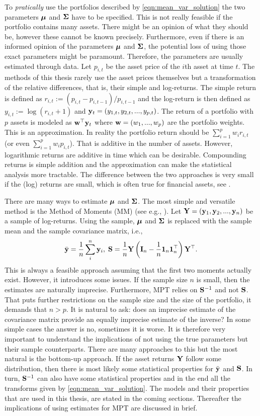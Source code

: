 \documentclass[12pt, oneside]{book}\usepackage{knitr}
\begin{document}
{To \textit{pratically} use the portfolios described by \eqref{eqn:mean_var_solution} the two parameters $\mbox{\boldmath$\mu$}$ and $\mathbf{\Sigma}$ have to be specified. 
This is not really feasible if the portfolio contains many assets. 
There might be an opinion of what they should be, however these cannot be known precisely. 
Furthermore, even if there is an informed opinion of the parameters $\mbox{\boldmath$\mu$}$ and $\mathbf{\Sigma}$, the potential loss of using those exact parameters might be paramount. 
Therefore, the parameters are usually estimated through data.
Let $p_{i,t}$ be the asset price of the $i$th asset at time $t$. 
The methods of this thesis rarely use the asset prices themselves but a transformation of the relative differences, that is, their simple and log-returns. 
The simple return is defined as $r_{i,t} := (p_{i,t}-p_{i,t-1})/p_{i,t-1}$ and the log-return is then defined as $y_{i,t} := \log(r_{i,t} + 1)$ and $\mathbf{y}_t=(y_{1,t},y_{2,t},..., y_{p,t})$.
The return of a portfolio with $p$ assets is modeled as $\mathbf{w}^\top \mathbf{y}_t$ where $\mathbf{w}=(w_1, ..., w_p)$ are the portfolio weights.
This is an approximation. 
In reality the portfolio return should be $\sum_{i=1}^p w_i r_{i,t}$ (or even $\sum_{i=1}^p w_i p_{i,t}$). 
That is additive in the number of assets.
However, logarithmic returns are additive in time which can be desirable. 
Compounding returns is simple addition and the approximation can make the statistical analysis more tractable. 
The difference between the two approaches is very small if the (log) returns are small, which is often true for financial assets, see \citet[p. 5]{tsay2005analysis}. 

There are many ways to estimate $\mbox{\boldmath$\mu$}$ and $\mathbf{\Sigma}$.
The most simple and versatile method is the Method of Moments (MM) (see e.g., \citet[ch. 9]{wasserman2004all}). 
Let $\mathbf{Y} = (\mathbf{y}_1, \mathbf{y}_2, ..., \mathbf{y}_n)$ be a sample of log-returns.
Using the sample, $\mbox{\boldmath$\mu$}$ and $\mathbf{\Sigma}$ is replaced with the sample mean and the sample covariance matrix, i.e.,
$$
\bar{\mathbf{y}} = \frac{1}{n} \sum_i^n \mathbf{y}_i, \; \mathbf{S} = \frac{1}{n}\mathbf{Y} \left(\mathbf{I}_n - \frac{1}{n} \mathbf{1}_n \mathbf{1}_n^\top \right) \mathbf{Y}^\top.
$$
This is always a feasible approach assuming that the first two moments actually exist. 
However, it introduces some issues.
If the sample size $n$ is small, then the estimates are naturally imprecise.
Furthermore, MPT relies on $\mathbf{S}^{-1}$ and not $\mathbf{S}$.
That puts further restrictions on the sample size and the size of the portfolio, it demands that $n>p$.
It is natural to ask: does an imprecise estimate of the covariance matrix provide an equally imprecise estimate of the inverse?
In some simple cases the answer is no, sometimes it is worse. 
It is therefore very important to understand the implications of not using the true parameters but their sample counterparts.
There are many approaches to this but the most natural is the bottom-up approach. 
If the asset returns $\mathbf{Y}$ follow some distribution, then there is most likely some statistical properties for $\bar{\mathbf{y}}$ and $\mathbf{S}$.
In turn, $\mathbf{S}^{-1}$ can also have some statistical properties and in the end all the transforms given by \eqref{eqn:mean_var_solution}.
The models and their properties that are used in this thesis, are stated in the coming sections.
Thereafter the implications of using estimates for MPT are discussed in brief.

}
\end{document}
